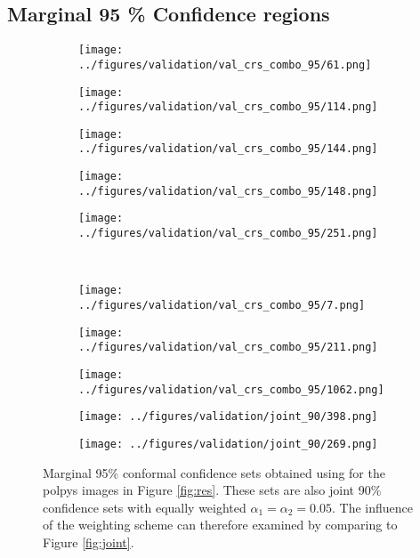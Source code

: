 \subsection{Marginal 95 \% Confidence regions}

\begin{figure}[h!]
	\begin{subfigure}{0.19\textwidth}
		\centering
		\texttt{[image: ../figures/validation/val\_crs\_combo\_95/61.png]}
		\label{fig:1}
	\end{subfigure}
	\begin{subfigure}{0.19\textwidth}
		\centering
		\texttt{[image: ../figures/validation/val\_crs\_combo\_95/114.png]}
		\label{fig:1}
	\end{subfigure}
	\begin{subfigure}{0.19\textwidth}
		\centering
		\texttt{[image: ../figures/validation/val\_crs\_combo\_95/144.png]}
		\label{fig:1}
	\end{subfigure}
	\begin{subfigure}{0.19\textwidth}
		\centering
		\texttt{[image: ../figures/validation/val\_crs\_combo\_95/148.png]}
		\label{fig:1}
	\end{subfigure}
	\begin{subfigure}{0.19\textwidth}
		\centering
		\texttt{[image: ../figures/validation/val\_crs\_combo\_95/251.png]}
		\label{fig:1}
	\end{subfigure}
	\vspace{-0.35cm}
	\\
	\begin{subfigure}{0.19\textwidth}
		\centering
		\texttt{[image: ../figures/validation/val\_crs\_combo\_95/7.png]}
		\label{fig:1}
	\end{subfigure}
	\begin{subfigure}{0.19\textwidth}
		\centering
		\texttt{[image: ../figures/validation/val\_crs\_combo\_95/211.png]}
		\label{fig:1}
	\end{subfigure}
	\begin{subfigure}{0.19\textwidth}
		\centering
		\texttt{[image: ../figures/validation/val\_crs\_combo\_95/1062.png]}
		\label{fig:1}
	\end{subfigure}
	\begin{subfigure}{0.19\textwidth}
		\centering
		\texttt{[image: ../figures/validation/joint\_90/398.png]}
		\label{fig:1}
	\end{subfigure}
	\begin{subfigure}{0.19\textwidth}
		\centering
		\texttt{[image: ../figures/validation/joint\_90/269.png]}
		\label{fig:1}
	\end{subfigure}
	\label{fig:grid}
	\caption{Marginal 95\% conformal confidence sets obtained using for the polpys images in Figure \ref{fig:res}. These sets are also joint 90\% confidence sets with equally weighted $\alpha_1 = \alpha_2 = 0.05$. The influence of the weighting scheme can therefore examined by comparing to Figure \ref{fig:joint}.}\label{fig:joint3}
\end{figure}
\newpage
